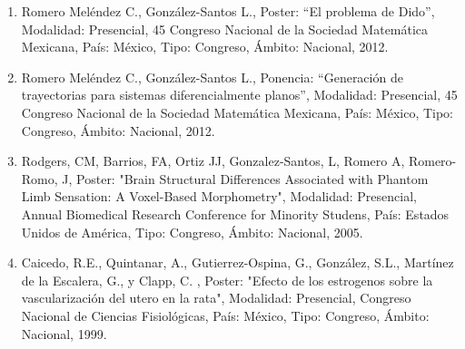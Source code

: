 \begin{enumerate}
\item Romero Meléndez C., González-Santos L., Poster: “El problema de Dido”, Modalidad: Presencial, 45 Congreso Nacional de la 
Sociedad Matemática Mexicana, País: México, Tipo: Congreso, Ámbito: Nacional, 2012.

\item Romero Meléndez C., González-Santos L., Ponencia: “Generación de trayectorias para sistemas diferencialmente planos”, 
Modalidad: Presencial, 45 Congreso Nacional de la Sociedad Matemática Mexicana, País: México, Tipo: Congreso, Ámbito: 
Nacional, 2012.

\item Rodgers, CM, Barrios, FA, Ortiz JJ, Gonzalez-Santos, L, Romero A, Romero-Romo, J, Poster: "Brain Structural Differences 
Associated with Phantom Limb Sensation: A Voxel-Based Morphometry", Modalidad: Presencial, Annual Biomedical Research 
Conference for Minority Studens, País: Estados Unidos de América, Tipo: Congreso, Ámbito: Nacional, 2005.

\item Caicedo, R.E., Quintanar, A., Gutierrez-Ospina, G., González, S.L., Martínez de la Escalera, G., y Clapp, C. , Poster: 
"Efecto de los estrogenos sobre la vascularización del utero en la rata", Modalidad: Presencial, Congreso Nacional de 
Ciencias Fisiológicas, País: México, Tipo: Congreso, Ámbito: Nacional, 1999.

\end{enumerate}


